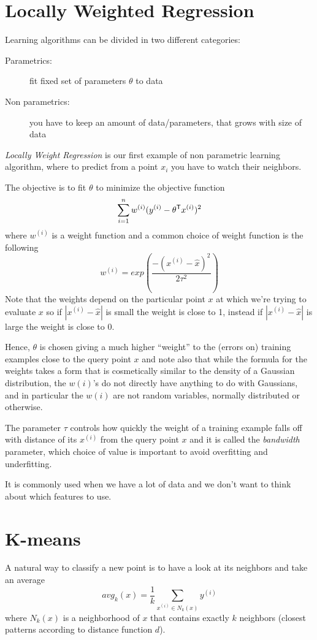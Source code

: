 \section{Locally Weighted Regression}
Learning algorithms can be divided in two different categories:
\begin{description}
    \item [Parametrics:] fit fixed set of parameters $\theta$ to data
    \item [Non parametrics:] you have to keep an amount of data/parameters, that grows with size of data
\end{description}
\emph{Locally Weight Regression} is our first example of non parametric learning algorithm, where to predict
from a point $x_i$ you have to watch their neighbors.

The objective is to fit $\theta$ to minimize the objective function
\[ \sum _{i = 1}^n w^{(i)}(y^{(i)} - \theta ^ \mathsf{T}x^{(i)})^2 \]
where $w^{(i)}$ is a weight function and a common choice of weight function is the following
\[ w^{(i)} = exp \left(\frac{-(x^{(i)} - \hat{x})^2}{2 \tau ^ 2}\right) \]
Note that the weights depend on the particular point $x$ at which we’re trying to evaluate $x$ so
if $|x^{(i)} - \hat{x}|$ is small the weight is close to 1, instead if $|x^{(i)} - \hat{x}|$ is 
large the weight is close to $0$.

Hence, $\theta$ is chosen giving a much higher “weight” to the (errors on) training examples close
to the query point $x$ and note also that while the formula for the weights takes a form that is 
cosmetically similar to the density of a Gaussian distribution, the $w(i)$’s do not directly have anything
to do with Gaussians, and in particular the $w(i)$ are not random variables, normally distributed or otherwise.

The parameter $\tau$ controls how quickly the weight of a training example falls off with distance of
its $x^{(i)}$ from the query point $x$ and it is called the \emph{bandwidth} parameter, which choice of value
is important to avoid overfitting and underfitting.

It is commonly used when we have a lot of data and we don't want to think about which features to use.

\section{K-means}
A natural way to classify a new point is to have a look at its neighbors and take an average 
\[ avg_k(x) = \frac{1}{k} \sum _{x^{(i)} \in N_k(x)} y^{(i)} \]
where $N_k(x)$ is a neighborhood of $x$ that contains exactly $k$ neighbors (closest patterns according to distance function $d$).


